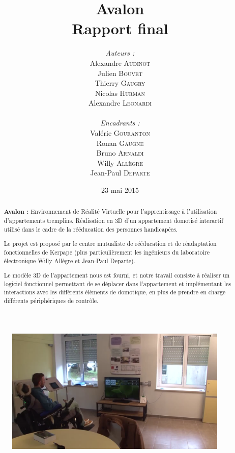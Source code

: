 \documentclass[a4paper,11pt]{article}
\title{
  \textbf{Avalon}\\
  Rapport final
}
\author{
\begin{minipage}{0.4\textwidth}
	\begin{flushleft} \large
		\emph{Auteurs :}\\
		Alexandre \textsc{Audinot}\\
		Julien \textsc{Bouvet}\\
		Thierry \textsc{Gaugry}\\
		Nicolas \textsc{Hurman}\\
		Alexandre \textsc{Leonardi}\\
	\end{flushleft}
\end{minipage}
\begin{minipage}{0.4\textwidth}
	\begin{flushright} \large
		\emph{Encadrants :} \\
		Valérie \textsc{Gouranton}\\
		Ronan \textsc{Gaugne}\\
		Bruno \textsc{Arnaldi}\\
		Willy \textsc{Allègre}\\
		Jean-Paul  \textsc{Departe}\\
	\end{flushright}
\end{minipage}
}
\date{23 mai 2015}
\begin{document}
\maketitle
\thispagestyle{empty}
\begin{abstract}
\textbf{Avalon :} Environnement de Réalité Virtuelle pour l'apprentissage à l'utilisation d'appartements tremplins. Réalisation en 3D d'un appartement domotisé interactif utilisé dans le cadre de la rééducation des personnes handicapées.\newline

Le projet est proposé par le centre mutualiste de rééducation et de réadaptation fonctionnelles de Kerpape (plus particulièrement les ingénieurs du laboratoire électronique Willy Allègre et Jean-Paul Departe).\newline

Le modèle 3D de l'appartement nous est fourni, et notre travail consiste à réaliser un logiciel fonctionnel permettant de se déplacer dans l'appartement et implémentant les interactions avec les différents éléments de domotique, en plus de prendre en charge différents périphériques de contrôle. 
\end{abstract}

\begin{figure}[h!]
	\centering
	\includegraphics[height=170pt]{7-RapportFinal/img/screen_appart.png}
\end{figure}
\end{document}
